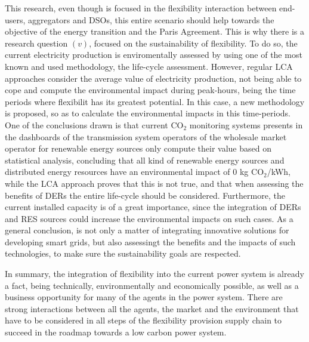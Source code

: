 This research, even though is focused in the flexibility interaction between end-users, aggregators and DSOs, this entire scenario should help towards the objective of the energy transition and the Paris Agreement. This is why there is a research question $(v)$, focused on the sustainability of flexibility. To do so, the current electricity production is enviromentally assessed by using one of the most known and used methodology, the life-cycle assessment. However, regular LCA approaches consider the average value of electricity production, not being able to cope and compute the environmental impact during peak-hours, being the time periods where flexibilit has its greatest potential. In this case, a new methodology is proposed, so as to calculate the environmental impacts in this time-periods. One of the conclusions drawn is that current CO$_2$ monitoring systems presents in the dashboards of the transmission system operators of the wholesale market operator for renewable energy sources only compute their value based on statistical analysis, concluding that all kind of renewable energy sources and distributed energy resources have an environmental impact of 0 kg CO$_2$/kWh, while the LCA approach proves that this is not true, and that when assessing the benefits of DERs the entire life-cycle should be considered. Furthermore, the current installed capacity is of a great importance, since the integration of DERs and RES sources could increase the environmental impacts on such cases. As a general conclusion, is not only a matter of integrating innovative solutions for developing smart grids, but also assessingt the benefits and the impacts of such technologies, to make sure the sustainability goals are respected. 

In summary, the integration of flexibility into the current power system is already a fact, being technically, environmentally and economically possible, as well as a business opportunity for many of the agents in the power system. There are strong interactions between all the agents, the market and the environment that have to be considered in all steps of the flexibility provision supply chain to succeed in the roadmap towards a low carbon power system. 
     
